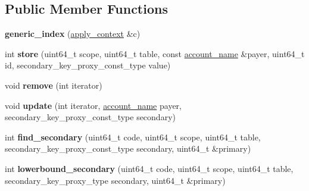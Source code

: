 \subsection*{Public Member Functions}
\begin{DoxyCompactItemize}
\item 
\mbox{\label{classaacio_1_1chain_1_1apply__context_1_1generic__index_a90a8528ed42f406e17a476d3c87da005}} 
{\bfseries generic\+\_\+index} (\mbox{\hyperlink{classaacio_1_1chain_1_1apply__context}{apply\+\_\+context}} \&c)
\item 
\mbox{\label{classaacio_1_1chain_1_1apply__context_1_1generic__index_a93213498587053286ab3edc5f19a5f82}} 
int {\bfseries store} (uint64\+\_\+t scope, uint64\+\_\+t table, const \mbox{\hyperlink{structaacio_1_1chain_1_1name}{account\+\_\+name}} \&payer, uint64\+\_\+t id, secondary\+\_\+key\+\_\+proxy\+\_\+const\+\_\+type value)
\item 
\mbox{\label{classaacio_1_1chain_1_1apply__context_1_1generic__index_a6c2d9aece2a343ab58a6a1b20def71f3}} 
void {\bfseries remove} (int iterator)
\item 
\mbox{\label{classaacio_1_1chain_1_1apply__context_1_1generic__index_ac4fe683b36ec055756981506fe5ca01a}} 
void {\bfseries update} (int iterator, \mbox{\hyperlink{structaacio_1_1chain_1_1name}{account\+\_\+name}} payer, secondary\+\_\+key\+\_\+proxy\+\_\+const\+\_\+type secondary)
\item 
\mbox{\label{classaacio_1_1chain_1_1apply__context_1_1generic__index_aa859bb8ec84f5b8fdbac60d79b7fbe40}} 
int {\bfseries find\+\_\+secondary} (uint64\+\_\+t code, uint64\+\_\+t scope, uint64\+\_\+t table, secondary\+\_\+key\+\_\+proxy\+\_\+const\+\_\+type secondary, uint64\+\_\+t \&primary)
\item 
\mbox{\label{classaacio_1_1chain_1_1apply__context_1_1generic__index_a2ae7d8267817bc1ef117629a5ae07f24}} 
int {\bfseries lowerbound\+\_\+secondary} (uint64\+\_\+t code, uint64\+\_\+t scope, uint64\+\_\+t table, secondary\+\_\+key\+\_\+proxy\+\_\+type secondary, uint64\+\_\+t \&primary)

\end{DoxyCompactItemize}
